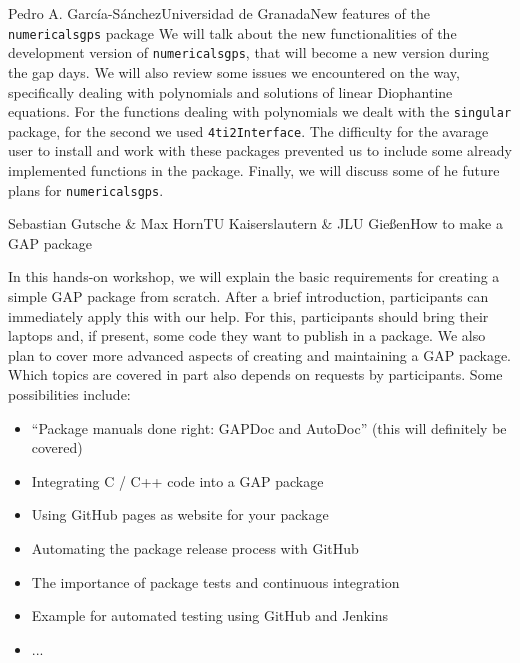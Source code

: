 \documentclass[12pt,a4paper]{article}
\begin{document}
\begin{Abstract}{Pedro A. García-Sánchez}{Universidad de Granada}{New features of the \texttt{numericalsgps} package}
We will talk about the new functionalities of the development version
of \texttt{numericalsgps}, that will become a new version during the gap
days. We will also review some issues we encountered on the way, specifically
dealing with polynomials and solutions of linear Diophantine equations. For
the functions dealing with polynomials we dealt with the \texttt{singular}
package, for the second we used \texttt{4ti2Interface}. The difficulty
for the avarage user to install and work with these packages prevented us
to include some already implemented functions in the package. Finally,
we will discuss some of he future plans for \texttt{numericalsgps}.
\end{Abstract}


\begin{Abstract}{Sebastian Gutsche \& Max Horn}{TU Kaiserslautern \& JLU Gießen}{How to make a GAP package}

In this hands-on workshop, we will explain the basic requirements for
creating a simple GAP package from scratch. After a brief introduction,
participants can immediately apply this with our help. For this,
participants should bring their laptops and, if present, some code they
want to publish in a package.
%
We also plan to cover more advanced aspects of creating and maintaining
a GAP package.  Which topics are covered in part also depends on requests
by participants. Some possibilities include:
\begin{itemize}[itemsep=0mm]
\item ``Package manuals done right: GAPDoc and AutoDoc'' (this will definitely be covered)
\item Integrating C / C++ code into a GAP package
\item Using GitHub pages as website for your package
\item Automating the package release process with GitHub
\item The importance of package tests and continuous integration
\item Example for automated testing using GitHub and Jenkins
\item ...
\end{itemize}

\end{Abstract}
\end{document}
